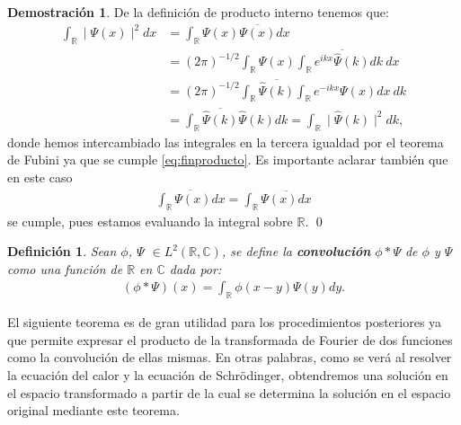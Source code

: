 \documentclass[12pt]{article}
\newtheorem{defn}[teo]{Definición}
\theoremstyle{definition}
\newtheorem*{demo}{Demostración}
\newcommand*{\field}[1]{\mathbb{#1}}
\begin{document}
\begin{demo} De la definición de producto interno tenemos que:
    \begin{align*}
     \int_{\field{R}} \mid \Psi(x)\mid^2 dx & = 
    \int_{\field{R}}  \Psi(x)\overline{\Psi(x)} dx \\  & = 
    (2\pi)^{-1/2} \int_{\field{R}} \Psi(x) \int_{\field{R}} \overline{e^{ikx}\hat{\Psi}(k)}dk\:dx
    \\ & = 
    (2\pi)^{-1/2} \int_{\field{R}} \overline{\hat{\Psi}(k)} \int_{\field{R}} e^{-ikx}\Psi(x)dx\:dk
    \\ & = 
     \int_{\field{R}} \overline{\hat{\Psi}(k)} \hat{\Psi}(k) dk = \int_{\field{R}} \mid \hat{\Psi}(k) \mid^2 dk,
    \end{align*}
    donde hemos intercambiado las integrales en la tercera igualdad por el teorema de Fubini ya que se cumple \eqref{eq:finproducto}. Es importante aclarar también que en este caso
    \begin{align*}
        \overline{\int_{\field{R}}\Psi(x)dx} = \int_{\field{R}}\overline{\Psi(x)dx}
    \end{align*}
    se cumple, pues estamos evaluando la integral sobre $\field{R}$.
    \qed
\end{demo}
\begin{defn}
    Sean $\phi$, $\Psi$ $\in L^2(\field{R},\field{C})$, se define la \textbf{convolución} $\phi*\Psi$ de $\phi$ y $\Psi$ como una función de $\field{R}$ en $\field{C}$ dada por: 
    \begin{align*}
        (\phi*\Psi)(x) = \int_{\field{R}} \phi(x-y)\Psi(y)dy.
    \end{align*}
\end{defn}
\noindent
El siguiente teorema es de gran utilidad para los procedimientos posteriores ya que permite expresar el producto de la transformada de Fourier de dos funciones como la convolución de ellas mismas. En otras palabras, como se verá al resolver la ecuación del calor y la ecuación de Schrödinger, obtendremos una solución en el espacio transformado a partir de la cual se determina la solución en el espacio original mediante este teorema.
\end{document}
